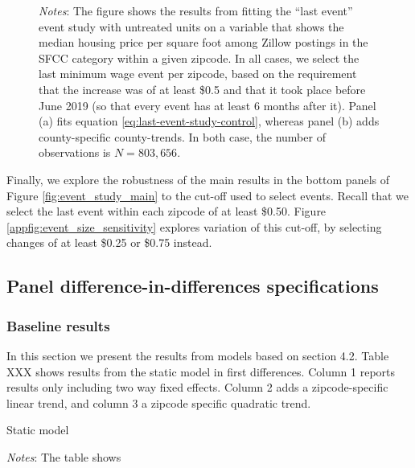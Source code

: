 \begin{figure}[h!]
\begin{subfigure}{0.5\textwidth}
        \end{subfigure}
        \begin{minipage}{.95\textwidth} \footnotesize
			\vspace{2mm} 
			\textit{Notes}: The figure shows the results from fitting the ``last event'' event study with untreated units on a variable that shows the median housing price per square foot among Zillow postings in the SFCC category within a given zipcode. In all cases, we select the last minimum wage event per zipcode, based on the requirement that the increase was of at least \$0.5 and that it took place before June 2019 (so that every event has at least 6 months after it). Panel (a) fits equation \ref{eq:last-event-study-control}, whereas panel (b) adds county-specific county-trends. In both case, the number of observations is $N = 803,656$.
		\end{minipage}
    \end{figure}
    
    Finally, we explore the robustness of the main results in the bottom panels of Figure \ref{fig:event_study_main} to the cut-off used to select events. Recall that we select the last event within each zipcode of at least \$0.50. Figure \ref{appfig:event_size_sensitivity} explores variation of this cut-off, by selecting changes of at least \$0.25 or \$0.75 instead.
    
    
    
\subsection{Panel difference-in-differences specifications}\label{subsec:results/first-differences}

    \subsubsection{Baseline results}
    
    In this section we present the results from models based on section 4.2. Table XXX shows results from the static model in first differences. Column 1 reports results only including two way fixed effects. Column 2 adds a zipcode-specific linear trend, and column 3 a zipcode specific quadratic trend. 
    
    \begin{table}[h!] \centering
        \caption{Static model}
        \label{tab:fd_table}
        \scalebox{0.85}{
        }
        \begin{minipage}{.95\textwidth} \footnotesize
			\vspace{3mm} 
			\textit{Notes}: The table shows
		\end{minipage}
    \end{table}
    
